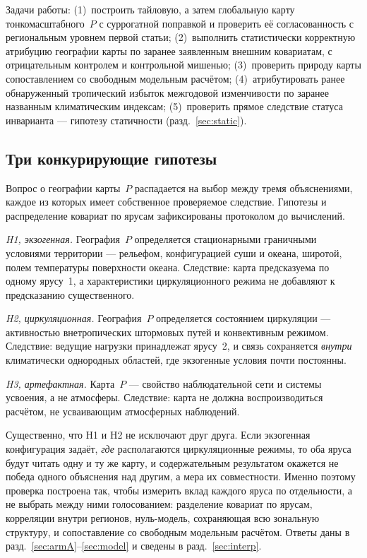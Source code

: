 \documentclass[11pt,a4paper]{article}
\begin{document}
Задачи работы: (1)~построить тайловую, а затем глобальную карту тонкомасштабного~$P$ с суррогатной поправкой и проверить её согласованность с региональным уровнем первой статьи; (2)~выполнить статистически корректную атрибуцию географии карты по заранее заявленным внешним ковариатам, с отрицательным контролем и контрольной мишенью; (3)~проверить природу карты сопоставлением со свободным модельным расчётом; (4)~атрибутировать ранее обнаруженный тропический избыток межгодовой изменчивости по заранее названным климатическим индексам; (5)~проверить прямое следствие статуса инварианта --- гипотезу статичности (разд.~\ref{sec:static}).

\subsection{Три конкурирующие гипотезы}
\label{sec:hypotheses}

Вопрос о географии карты~$P$ распадается на выбор между тремя объяснениями, каждое из которых имеет собственное проверяемое следствие. Гипотезы и распределение ковариат по ярусам зафиксированы протоколом до вычислений.

\emph{H1, экзогенная.} География~$P$ определяется стационарными граничными условиями территории --- рельефом, конфигурацией суши и океана, широтой, полем температуры поверхности океана. Следствие: карта предсказуема по одному ярусу~1, а характеристики циркуляционного режима не добавляют к предсказанию существенного.

\emph{H2, циркуляционная.} География~$P$ определяется состоянием циркуляции --- активностью внетропических штормовых путей и конвективным режимом. Следствие: ведущие нагрузки принадлежат ярусу~2, и связь сохраняется \emph{внутри} климатически однородных областей, где экзогенные условия почти постоянны.

\emph{H3, артефактная.} Карта~$P$ --- свойство наблюдательной сети и системы усвоения, а не атмосферы. Следствие: карта не должна воспроизводиться расчётом, не усваивающим атмосферных наблюдений.

Существенно, что H1 и H2 не исключают друг друга. Если экзогенная конфигурация задаёт, \emph{где} располагаются циркуляционные режимы, то оба яруса будут читать одну и ту же карту, и содержательным результатом окажется не победа одного объяснения над другим, а мера их совместности. Именно поэтому проверка построена так, чтобы измерить вклад каждого яруса по отдельности, а не выбрать между ними голосованием: разделение ковариат по ярусам, корреляции внутри регионов, нуль-модель, сохраняющая всю зональную структуру, и сопоставление со свободным модельным расчётом. Ответы даны в разд.~\ref{sec:armA}--\ref{sec:model} и сведены в разд.~\ref{sec:interp}.
\end{document}
